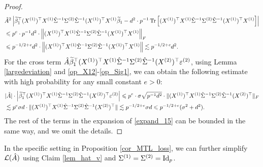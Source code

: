 \begin{proof}
\begin{align*}
&\hat A^2 \left|\wt \beta_1^\top (X^{(1)})^\top X^{(1)} \hat \Sigma^{-1}  \Sigma^{(2)} \hat \Sigma^{-1}  (X^{(1)})^\top X^{(1)}\wt\beta_1 - d^2 \cdot p^{-1}\bigtr{(X^{(1)})^\top X^{(1)} \hat \Sigma^{-1}  \Sigma^{(2)} \hat \Sigma^{-1}  (X^{(1)})^\top X^{(1)}}\right| \\
&\le p^e\cdot p^{-1}d^2 \cdot \left\| (X^{(1)})^\top X^{(1)} \hat \Sigma^{-1}  \Sigma^{(2)} \hat \Sigma^{-1}  (X^{(1)})^\top X^{(1)} \right\|_F \\
&\le p^{-1/2+\e}d^2 \cdot  \left\| (X^{(1)})^\top X^{(1)} \hat \Sigma^{-1}  \Sigma^{(2)} \hat \Sigma^{-1}  (X^{(1)})^\top X^{(1)} \right\|  \lesssim p^{-1/2+\e}d^2.
\end{align*} 
For the cross term $\hat A \wt \beta_1^\top (X^{(1)})^\top X^{(1)} \hat \Sigma^{-1}  \Sigma^{(2)} \hat \Sigma^{-1}  (X^{(2)})^\top  \epsilon^{(2)}$, using Lemma \ref{largedeviation} and \eqref{op_X12}-\eqref{op_Sig1}, we can obtain the following estimate with high probability for any small constant $e>0$:
\begin{align*}
&|\hat A |\cdot \left|\wt \beta_1^\top (X^{(1)})^\top X^{(1)} \hat \Sigma^{-1}  \Sigma^{(2)} \hat \Sigma^{-1}  (X^{(2)})^\top  \epsilon^{(2)}\right| \le p^e \cdot \sigma\sqrt{p^{-1}d^2} \cdot \|(X^{(1)})^\top X^{(1)} \hat \Sigma^{-1}  \Sigma^{(2)} \hat \Sigma^{-1}  (X^{(2)})^\top  \|_F \\
&\lesssim p^{e}\sigma d \cdot  \|(X^{(1)})^\top X^{(1)} \hat \Sigma^{-1}  \Sigma^{(2)} \hat \Sigma^{-1}  (X^{(2)})^\top  \| \lesssim p^{-1/2+e}\sigma d\le p^{-1/2+e}(\sigma^2+ d^2).
\end{align*}
The rest of the terms in the expansion of \eqref{expand_15} can be bounded in the same way, and we omit the details.
 \end{proof}
 
In the specific setting in Proposition \ref{cor_MTL_loss}, we can further simplify $\cal L(\hat A)$ using Claim \ref{lem_hat_v} and $\Sigma^{(1)}=\Sigma^{(2)}=\id_p$.
 

